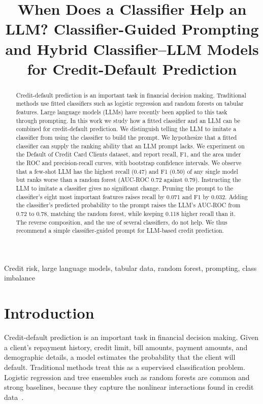 \documentclass[conference]{IEEEtran}
\title{When Does a Classifier Help an LLM? Classifier-Guided Prompting and Hybrid Classifier--LLM Models for Credit-Default Prediction}
\author{
\IEEEauthorblockN{Rishi Datta}
\IEEEauthorblockA{Amador Valley High School\\ Pleasanton, California, USA\\ rishidatta20@gmail.com}
\and
\IEEEauthorblockN{Lavanya Prahallad}
\IEEEauthorblockA{Research Spark Hub Inc.\\ Dublin, California, USA\\ lavanya@researchsparkhub.com}
}
\begin{document}
\maketitle

\begin{abstract}
Credit-default prediction is an important task in financial decision making. Traditional methods use fitted classifiers such as logistic regression and random forests on tabular features. Large language models (LLMs) have recently been applied to this task through prompting. In this work we study how a fitted classifier and an LLM can be combined for credit-default prediction. We distinguish telling the LLM to imitate a classifier from using the classifier to build the prompt. We hypothesize that a fitted classifier can supply the ranking ability that an LLM prompt lacks. We experiment on the Default of Credit Card Clients dataset, and report recall, F1, and the area under the ROC and precision-recall curves, with bootstrap confidence intervals. We observe that a few-shot LLM has the highest recall (0.47) and F1 (0.50) of any single model but ranks worse than a random forest (AUC-ROC 0.72 against 0.79). Instructing the LLM to imitate a classifier gives no significant change. Pruning the prompt to the classifier's eight most important features raises recall by 0.071 and F1 by 0.032. Adding the classifier's predicted probability to the prompt raises the LLM's AUC-ROC from 0.72 to 0.78, matching the random forest, while keeping 0.118 higher recall than it. The reverse composition, and the use of several classifiers, do not help. We thus recommend a simple classifier-guided prompt for LLM-based credit prediction.
\end{abstract}

\begin{IEEEkeywords}
Credit risk, large language models, tabular data, random forest, prompting, class imbalance
\end{IEEEkeywords}

\section{Introduction}

Credit-default prediction is an important task in financial decision making. Given a client's repayment history, credit limit, bill amounts, payment amounts, and demographic details, a model estimates the probability that the client will default. Traditional methods treat this as a supervised classification problem. Logistic regression and tree ensembles such as random forests are common and strong baselines, because they capture the nonlinear interactions found in credit data~\cite{yeh2009comparative,breiman2001random,lessmann2015benchmarking}.
\end{document}
